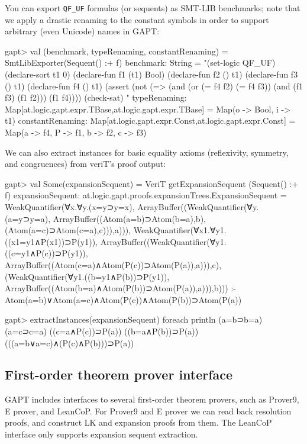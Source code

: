 \documentclass[a4paper,11pt]{article}
\begin{document}
You can export \verb,QF_UF, formulas (or sequents) as SMT-LIB benchmarks;
note that we apply a drastic renaming to the constant symbols in order to
support arbitrary (even Unicode) names in GAPT:
\begin{clilisting}
gapt> val (benchmark, typeRenaming, constantRenaming) =                                 SmtLibExporter(Sequent() :+ f)
benchmark: String =
"(set-logic QF_UF)
(declare-sort t1 0)
(declare-fun f1 (t1) Bool)
(declare-fun f2 () t1)
(declare-fun f3 () t1)
(declare-fun f4 () t1)
(assert (not (=> (and (or (= f4 f2) (= f4 f3)) (and (f1 f3) (f1 f2))) (f1 f4))))
(check-sat)
"
typeRenaming: Map[at.logic.gapt.expr.TBase,at.logic.gapt.expr.TBase] = Map(o -> Bool, i -> t1)
constantRenaming: Map[at.logic.gapt.expr.Const,at.logic.gapt.expr.Const] = Map(a -> f4, P -> f1, b -> f2, c -> f3)

\end{clilisting}

We can also extract instances for basic equality axioms (reflexivity, symmetry,
and congruences) from veriT's proof output:
\begin{clilisting}
gapt> val Some(expansionSequent) = VeriT getExpansionSequent (Sequent() :+ f)
expansionSequent: at.logic.gapt.proofs.expansionTrees.ExpansionSequent = WeakQuantifier(∀x.∀y.(x=y⊃y=x), ArrayBuffer((WeakQuantifier(∀y.(a=y⊃y=a), ArrayBuffer((Atom(a=b)⊃Atom(b=a),b), (Atom(a=c)⊃Atom(c=a),c))),a))), WeakQuantifier(∀x1.∀y1.((x1=y1∧P(x1))⊃P(y1)), ArrayBuffer((WeakQuantifier(∀y1.((c=y1∧P(c))⊃P(y1)), ArrayBuffer((Atom(c=a)∧Atom(P(c))⊃Atom(P(a)),a))),c), (WeakQuantifier(∀y1.((b=y1∧P(b))⊃P(y1)), ArrayBuffer((Atom(b=a)∧Atom(P(b))⊃Atom(P(a)),a))),b))) :- Atom(a=b)∨Atom(a=c)∧Atom(P(c))∧Atom(P(b))⊃Atom(P(a))

gapt> extractInstances(expansionSequent) foreach println
(a=b⊃b=a)
(a=c⊃c=a)
((c=a∧P(c))⊃P(a))
((b=a∧P(b))⊃P(a))
(((a=b∨a=c)∧(P(c)∧P(b)))⊃P(a))

\end{clilisting}

\subsection{First-order theorem prover interface}

GAPT includes interfaces to several first-order theorem provers, such as
Prover9, E prover, and LeanCoP.  For Prover9 and E prover we can read back
resolution proofs, and construct LK and expansion proofs from them.  The
LeanCoP interface only supports expansion sequent extraction.
\end{document}
